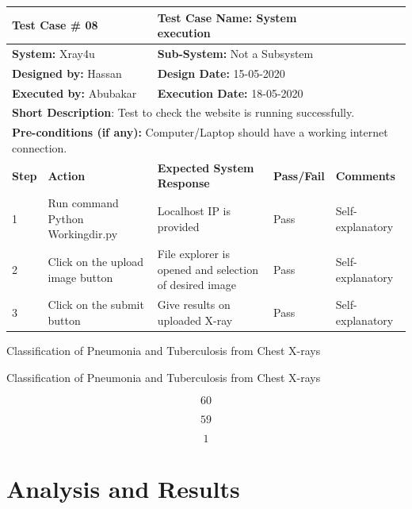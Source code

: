 \documentclass{article} %
\begin{document}
\begin{tabular}{|p{0.3in}|p{1.2in}|p{1.5in}|p{0.5in}|p{0.6in}|} \hline 
\multicolumn{2}{|p{1in}|}{\textbf{Test Case \#} 08} & \multicolumn{2}{|p{2.0in}|}{\textbf{Test Case Name:} System execution} &  \\ \hline 
\multicolumn{2}{|p{1in}|}{\textbf{System:} Xray4u} & \multicolumn{2}{|p{2.0in}|}{\textbf{Sub-System: }Not a Subsystem} &  \\ \hline 
\multicolumn{2}{|p{1in}|}{\textbf{Designed by:} Hassan} & \multicolumn{2}{|p{2.0in}|}{\textbf{Design Date:} 15-05-2020} &  \\ \hline 
\multicolumn{2}{|p{1in}|}{\textbf{Executed by: }Abubakar} & \multicolumn{2}{|p{2.0in}|}{\textbf{Execution Date:} 18-05-2020} &  \\ \hline 
\multicolumn{5}{|p{1in}|}{\textbf{Short Description}: Test to check the website is running successfully.} \\ \hline 
\multicolumn{5}{|p{1in}|}{\textbf{Pre-conditions (if any):} Computer/Laptop should have a working internet connection. } \\ \hline 
\textbf{Step} & \textbf{Action} & \textbf{Expected System Response} & \textbf{Pass/Fail} & \textbf{Comments} \\ \hline 
1 & Run command Python Workingdir.py & Localhost IP is provided & Pass & Self-explanatory \\ \hline 
2 & Click on the upload image button & File explorer is opened and selection of desired image & Pass & Self-explanatory \\ \hline 
3 & Click on the submit button & Give results on uploaded X-ray & Pass & Self-explanatory \\ \hline 
\end{tabular}

Classification of Pneumonia and Tuberculosis from Chest X-rays

\noindent 

\noindent  Classification of Pneumonia and Tuberculosis from Chest X-rays

\noindent 

\noindent 
\[60\] 

\[59\] 


\noindent 

\noindent 
\[1\] 


\noindent \textbf{}


\section{  Analysis and Results}
\end{document}
